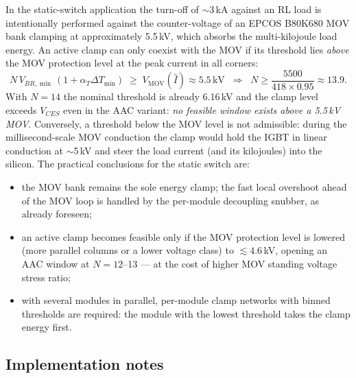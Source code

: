 \documentclass[11pt,a4paper]{article}
\begin{document}
In the static-switch application \cite{ssprop} the turn-off of
$\sim$3\,kA against an RL load is intentionally performed against the
counter-voltage of an EPCOS B80K680 MOV bank clamping at approximately
5.5\,kV, which absorbs the multi-kilojoule load energy. An active clamp
can only coexist with the MOV if its threshold lies \emph{above} the
MOV protection level at the peak current in all corners:
%
\begin{equation}
  N\,V_{BR,\min}\,(1+\alpha_T\Delta T_{\min}) \;\ge\; V_{\mathrm{MOV}}(\hat{I})
  \approx 5.5\,\mathrm{kV}
  \;\;\Rightarrow\;\;
  N \ge \frac{5500}{418\times0.95} \approx 13.9 .
\end{equation}
%
With $N=14$ the nominal threshold is already 6.16\,kV and the clamp
level exceeds $V_{CES}$ even in the AAC variant: \emph{no feasible
window exists above a 5.5\,kV MOV}. Conversely, a threshold below the
MOV level is not admissible: during the millisecond-scale MOV
conduction the clamp would hold the IGBT in linear conduction at
$\sim$5\,kV and steer the load current (and its kilojoules) into the
silicon. The practical conclusions for the static switch are:
%
\begin{itemize}
  \item the MOV bank remains the sole energy clamp; the fast local
        overshoot ahead of the MOV loop is handled by the per-module
        decoupling snubber, as already foreseen;
  \item an active clamp becomes feasible only if the MOV protection
        level is lowered (more parallel columns or a lower voltage
        class) to $\lesssim 4.6$\,kV, opening an AAC window at
        $N=12$--13 --- at the cost of higher MOV standing voltage
        stress ratio;
  \item with several modules in parallel, per-module clamp networks
        with binned thresholds are required: the module with the lowest
        threshold takes the clamp energy first.
\end{itemize}

\subsection{Implementation notes}
\end{document}
